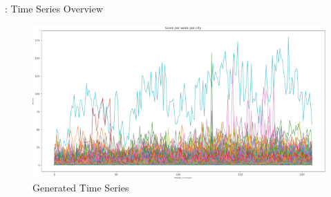 \begin{frame}{\currentname: Time Series Overview}

    \begin{figure}
        \centering
        \includegraphics[width=.99\textwidth]{img/ts/a.png}
        \caption{Generated Time Series}
        \label{GTS}
    \end{figure}
    

\end{frame}




